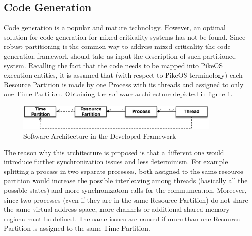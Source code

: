\subsection{Code Generation}
Code generation is a popular and mature technology. However, an optimal solution for code generation for mixed-criticality systems has not be found. Since robust partitioning is the common way to address mixed-criticality the code generation framework should take as input the description of such partitioned system. Recalling the fact that the code needs to be mapped into PikeOS execution entities, it is assumed that (with respect to PikeOS terminology) each Resource Partition is made by one Process with its threads and assigned to only one Time Partition. Obtaining the software architecture depicted in figure \ref{fig:SWArchitecture}.
\begin{figure}[htbp] 
\centering    
\includegraphics[width=0.9\textwidth]{SWArchitecture}
\caption{Software Architecture in the Developed Framework}
\label{fig:SWArchitecture}
\end{figure}
The reason why this architecture is proposed is that a different one would introduce further synchronization issues and less determinism. For example splitting a process in two separate processes, both assigned to the same resource partition would increase the possible interleaving among threads (basically all the possible states) and more synchronization calls for the communication. Moreover, since two processes (even if they are in the same Resource Partition) do not share the same virtual address space, more channels or additional shared memory regions must be defined. The same issues are caused if more than one Resource Partition is assigned to the same Time Partition.

